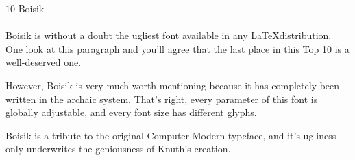 \documentclass{article}
\begin{document}
\frenchspacing
\noindent
{\LARGE $10$ Boisik}~\\
~\\
Boisik is without a doubt the ugliest font available in any \LaTeX distribution.
One look at this paragraph and you'll agree that the last place in this Top 10 is a well-deserved one.

However, Boisik is very much worth mentioning because it has completely been written in the archaic \MF{} system.
That's right, every parameter of this font is globally adjustable, and every font size has different glyphs.

Boisik is a tribute to the original Computer Modern typeface, and it's ugliness only underwrites the geniousness
of Knuth's creation.
\end{document}

